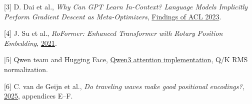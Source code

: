 \documentclass[10pt,a4paper]{article}
\begin{document}
{\footnotesize [3] D. Dai et al., \emph{Why Can GPT Learn In-Context? Language Models Implicitly
Perform Gradient Descent as Meta-Optimizers}, \href{https://aclanthology.org/2023.findings-acl.247/}{Findings of ACL 2023}.}

{\footnotesize [4] J. Su et al., \emph{RoFormer: Enhanced Transformer with Rotary Position
Embedding}, \href{https://arxiv.org/abs/2104.09864}{2021}.}

{\footnotesize [5] Qwen team and Hugging Face, \href{https://github.com/huggingface/transformers/blob/main/src/transformers/models/qwen3/modeling_qwen3.py}{Qwen3 attention implementation}, Q/K RMS normalization.}

{\footnotesize [6] C. van de Geijn et al., \emph{Do traveling waves make good positional encodings?},
\href{https://arxiv.org/html/2511.11668v1}{2025}, appendices E--F.}
\end{document}
